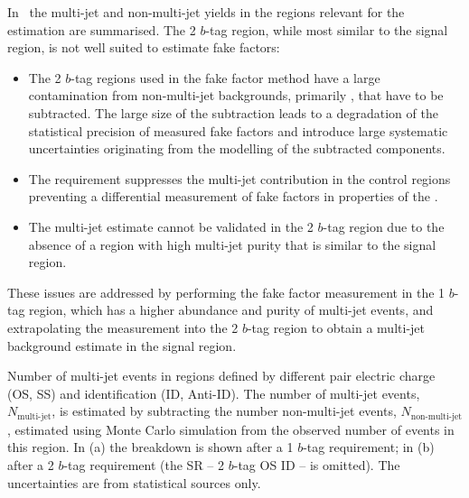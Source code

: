 In~ the multi-jet and non-multi-jet yields in
the regions relevant for the \faketauhadvis estimation are
summarised. The 2 $b$-tag region, while most similar to the signal
region, is not well suited to estimate fake factors:
\begin{itemize}

\item The 2 $b$-tag regions used in the fake factor method have a
  large contamination from non-multi-jet backgrounds, primarily
  \ttbarFakes, that have to be subtracted. The large size of the
  subtraction leads to a degradation of the statistical precision of
  measured fake factors and introduce large systematic uncertainties
  originating from the modelling of the subtracted components.

\item The \btag requirement suppresses the multi-jet contribution in
  the control regions preventing a differential measurement of fake
  factors in properties of the \tauhadvis.

\item The multi-jet estimate cannot be validated in the 2 $b$-tag
  region due to the absence of a region with high multi-jet purity
  that is similar to the signal region.

\end{itemize}
These issues are addressed by performing the fake factor measurement
in the 1 $b$-tag region, which has a higher abundance and purity of
multi-jet events, and extrapolating the measurement into the 2 $b$-tag
region to obtain a multi-jet background estimate in the signal region.

\begin{table}[htbp]
  \centering

  \begin{subtable}[t]{\textwidth}
    \centering
    
    \label{tab:mjfakes_yields_1tag}
  \end{subtable}

  \begin{subtable}[t]{\textwidth}
    \centering
    
  \end{subtable}

  \caption{Number of multi-jet events in regions defined by different
    \tauhadvis pair electric charge (OS, SS) and \tauhadvis
    identification (ID, Anti-ID). The number of multi-jet events,
    $N_\text{multi-jet}$, is estimated by subtracting the number
    non-multi-jet events, $N_\text{non-multi-jet}$, estimated using
    Monte Carlo simulation from the observed number of events in this
    region. In (a) the breakdown is shown after a 1 $b$-tag
    requirement; in (b) after a 2 $b$-tag requirement (the SR -- 2
    $b$-tag OS ID -- is omitted). The uncertainties are from
    statistical sources only.}
  \label{tab:mjfakes_yields}
\end{table}

